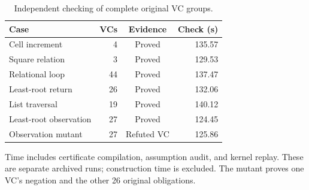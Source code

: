 \begin{table}[t]
\centering\small
\caption{Independent checking of complete original VC groups.}
\label{tab:proofs}
\begin{tabular}{@{}lrcr@{}}
\toprule
Case & VCs & Evidence & Check (s) \\
\midrule
Cell increment & 4 & Proved & 135.57 \\
Square relation & 3 & Proved & 129.53 \\
Relational loop & 44 & Proved & 137.47 \\
Least-root return & 26 & Proved & 132.06 \\
List traversal & 19 & Proved & 140.12 \\
Least-root observation & 27 & Proved & 124.45 \\
Observation mutant & 27 & Refuted VC & 125.86 \\
\bottomrule
\end{tabular}
\par\smallskip\parbox{\columnwidth}{\footnotesize Time includes certificate compilation, assumption audit, and kernel replay. These are separate archived runs; construction time is excluded. The mutant proves one VC's negation and the other 26 original obligations.}
\end{table}
